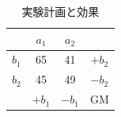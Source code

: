 \begin{table}[ht]
	\centering
	\caption{実験計画と効果}
	\begin{tabular}{c|cc|c}
		      & $a_1$  & $a_2$  &        \\\hline
		$b_1$ & 65     & 41     & $+b_2$ \\
		$b_2$ & 45     & 49     & $-b_2$ \\\hline
		      & $+b_1$ & $-b_1$ & GM
	\end{tabular}
	\label{tbl::13_05}
\end{table}

